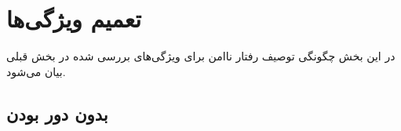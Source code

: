 \section{تعمیم ویژگی‌ها}
در این بخش چگونگی توصیف رفتار ناامن برای ویژگی‌های بررسی شده در بخش قبلی بیان می‌شود.

\subsection{بدون دور بودن}
